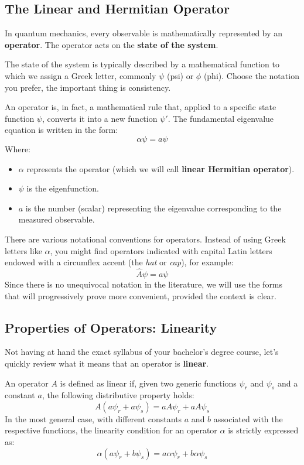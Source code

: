 \subsection{The Linear and Hermitian Operator}

In quantum mechanics, every observable is mathematically represented by an \textbf{operator}. The operator acts on the \textbf{state of the system}.

The state of the system is typically described by a mathematical function to which we assign a Greek letter, commonly $\psi$ (psi) or $\phi$ (phi). Choose the notation you prefer, the important thing is consistency.

An operator is, in fact, a mathematical rule that, applied to a specific state function $\psi$, converts it into a new function $\psi'$.
The fundamental eigenvalue equation is written in the form:
\begin{equation}
\alpha \psi = a \psi
\end{equation}
Where:
\begin{itemize}
\item $\alpha$ represents the operator (which we will call \textbf{linear Hermitian operator}).
\item $\psi$ is the eigenfunction.
\item $a$ is the number (scalar) representing the eigenvalue corresponding to the measured observable.
\end{itemize}

There are various notational conventions for operators. Instead of using Greek letters like $\alpha$, you might find operators indicated with capital Latin letters endowed with a circumflex accent (the \textit{hat} or \textit{cap}), for example:
\begin{equation}
\hat{A} \psi = a \psi
\end{equation}
Since there is no unequivocal notation in the literature, we will use the forms that will progressively prove more convenient, provided the context is clear.

\subsection{Properties of Operators: Linearity}

Not having at hand the exact syllabus of your bachelor's degree course, let's quickly review what it means that an operator is \textbf{linear}.

An operator $A$ is defined as linear if, given two generic functions $\psi_r$ and $\psi_s$ and a constant $a$, the following distributive property holds:
\begin{equation}
A (a\psi_r + a\psi_s) = a A \psi_r + a A \psi_s
\end{equation}
In the most general case, with different constants $a$ and $b$ associated with the respective functions, the linearity condition for an operator $\alpha$ is strictly expressed as:
\begin{equation}
\alpha (a\psi_r + b\psi_s) = a \alpha \psi_r + b \alpha \psi_s
\end{equation}

